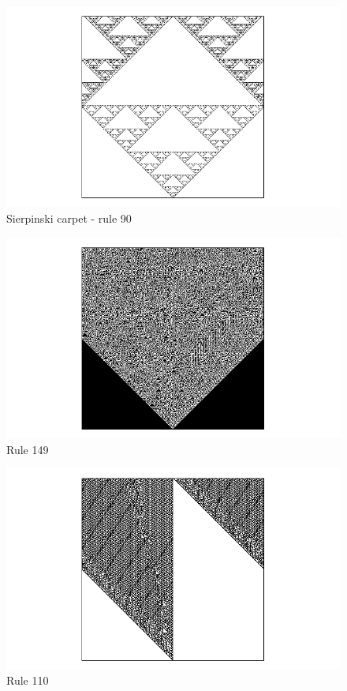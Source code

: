 \begin{figure}
 \centering
 \includegraphics[trim = 40mm 0mm 0mm 0mm, width=1.7\textwidth]{./img/90_500}
 \caption{Sierpinski carpet - rule 90}
 \label{koberec}
\end{figure}


\begin{figure}
 \centering
 \includegraphics[trim = 40mm 0mm 0mm 0mm, width=1.7\textwidth]{./img/149_500}
 \caption{Rule 149}
 \label{koberec}
\end{figure}

\begin{figure}
 \centering
 \includegraphics[trim = 40mm 0mm 0mm 0mm, width=1.7\textwidth]{./img/110_500}
 \caption{Rule 110}
\end{figure}

